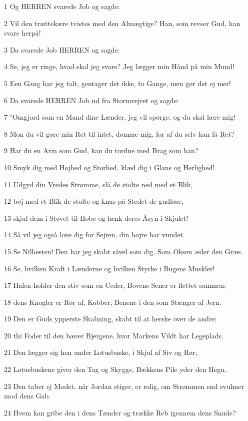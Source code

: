 \par 1 Og HERREN svarede Job og sagde:
\par 2 Vil den trættekære tvistes med den Almægtige? Han, som revser Gud, han svare herpå!
\par 3 Da svarede Job HERREN og sagde:
\par 4 Se, jeg er ringe, hvad skal jeg svare? Jeg lægger min Hånd på min Mund!
\par 5 Een Gang har jeg talt, gentager det ikke, to Gange, men gør det ej mer!
\par 6 Da svarede HERREN Job ud fra Stormvejret og sagde:
\par 7 "Omgjord som en Mand dine Lænder, jeg vil spørge, og du skal lære mig!
\par 8 Mon du vil gøre min Ret til intet, dømme mig, for af du selv kan få Ret?
\par 9 Har du en Arm som Gud, kan du tordne med Brag som han?
\par 10 Smyk dig med Højhed og Storhed, klæd dig i Glans og Herlighed!
\par 11 Udgyd din Vredes Strømme, slå de stolte ned med et Blik,
\par 12 bøj med et Blik de stolte og knus på Stedet de gudløse,
\par 13 skjul dem i Støvet til Hobe og lænk deres Åsyn i Skjulet!
\par 14 Så vil jeg også love dig for Sejren, din højre har vundet.
\par 15 Se Nilhesten! Den har jeg skabt såvel som dig. Som Oksen æder den Græs.
\par 16 Se, hvilken Kraft i Lænderne og hvilken Styrke i Bugens Muskler!
\par 17 Halen holder den stiv som en Ceder, Bovens Sener er flettet sammen;
\par 18 dens Knogler er Rør af, Kobber, Benene i den som Stænger af Jern.
\par 19 Den er Guds ypperste Skabning, skabt til at herske over de andre;
\par 20 thi Foder til den bærer Bjergene, hvor Markens Vildt har Legeplads.
\par 21 Den lægger sig hen under Lotusbuske, i Skjul af Siv og Rør;
\par 22 Lotusbuskene giver den Tag og Skygge, Bækkens Pile yder den Hegn.
\par 23 Den taber ej Modet, når Jordan stiger, er rolig, om Strømmen end svulmer mod dens Gab.
\par 24 Hvem kan gribe den i dens Tænder og trække Reb igennem dens Snude?
